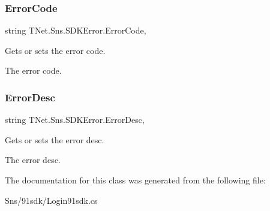 \subsubsection{\texorpdfstring{Error\+Code}{ErrorCode}}
{\footnotesize\ttfamily string T\+Net.\+Sns.\+S\+D\+K\+Error.\+Error\+Code\hspace{0.3cm}{\ttfamily [get]}, {\ttfamily [set]}}



Gets or sets the error code. 

The error code.\mbox{\label{class_t_net_1_1_sns_1_1_s_d_k_error_ad048a85c2fb7ba654f2e46776936f93c}} 
\subsubsection{\texorpdfstring{Error\+Desc}{ErrorDesc}}
{\footnotesize\ttfamily string T\+Net.\+Sns.\+S\+D\+K\+Error.\+Error\+Desc\hspace{0.3cm}{\ttfamily [get]}, {\ttfamily [set]}}



Gets or sets the error desc. 

The error desc.

The documentation for this class was generated from the following file\+:\begin{DoxyCompactItemize}
\item 
Sns/91sdk/Login91sdk.\+cs\end{DoxyCompactItemize}
